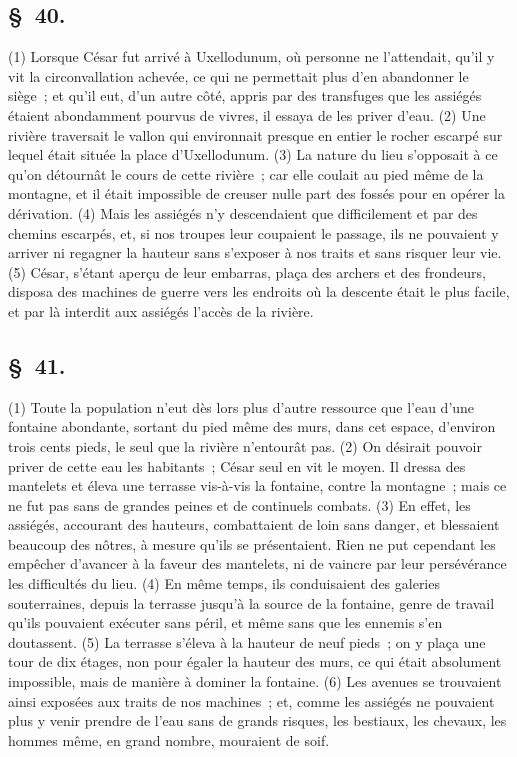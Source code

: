 \documentclass[french,twoside]{book} %
\begin{document}
\subsection[{§ 40.}]{ \textsc{§ 40.} }
\noindent (1) Lorsque César fut arrivé à Uxellodunum, où personne ne l’attendait, qu’il y vit la circonvallation achevée, ce qui ne permettait plus d’en abandonner le siège ; et qu’il eut, d’un autre côté, appris par des transfuges que les assiégés étaient abondamment pourvus de vivres, il essaya de les priver d’eau. (2) Une rivière traversait le vallon qui environnait presque en entier le rocher escarpé sur lequel était située la place d’Uxellodunum. (3) La nature du lieu s’opposait à ce qu’on détournât le cours de cette rivière ; car elle coulait au pied même de la montagne, et il était impossible de creuser nulle part des fossés pour en opérer la dérivation. (4) Mais les assiégés n’y descendaient que difficilement et par des chemins escarpés, et, si nos troupes leur coupaient le passage, ils ne pouvaient y arriver ni regagner la hauteur sans s’exposer à nos traits et sans risquer leur vie. (5) César, s’étant aperçu de leur embarras, plaça des archers et des frondeurs, disposa des machines de guerre vers les endroits où la descente était le plus facile, et par là interdit aux assiégés l’accès de la rivière.
\subsection[{§ 41.}]{ \textsc{§ 41.} }
\noindent (1) Toute la population n’eut dès lors plus d’autre ressource que l’eau d’une fontaine abondante, sortant du pied même des murs, dans cet espace, d’environ trois cents pieds, le seul que la rivière n’entourât pas. (2) On désirait pouvoir priver de cette eau les habitants ; César seul en vit le moyen. Il dressa des mantelets et éleva une terrasse vis-à-vis la fontaine, contre la montagne ; mais ce ne fut pas sans de grandes peines et de continuels combats. (3) En effet, les assiégés, accourant des hauteurs, combattaient de loin sans danger, et blessaient beaucoup des nôtres, à mesure qu’ils se présentaient. Rien ne put cependant les empêcher d’avancer à la faveur des mantelets, ni de vaincre par leur persévérance les difficultés du lieu. (4) En même temps, ils conduisaient des galeries souterraines, depuis la terrasse jusqu’à la source de la fontaine, genre de travail qu’ils pouvaient exécuter sans péril, et même sans que les ennemis s’en doutassent. (5) La terrasse s’éleva à la hauteur de neuf pieds ; on y plaça une tour de dix étages, non pour égaler la hauteur des murs, ce qui était absolument impossible, mais de manière à dominer la fontaine. (6) Les avenues se trouvaient ainsi exposées aux traits de nos machines ; et, comme les assiégés ne pouvaient plus y venir prendre de l’eau sans de grands risques, les bestiaux, les chevaux, les hommes même, en grand nombre, mouraient de soif.
\end{document}
